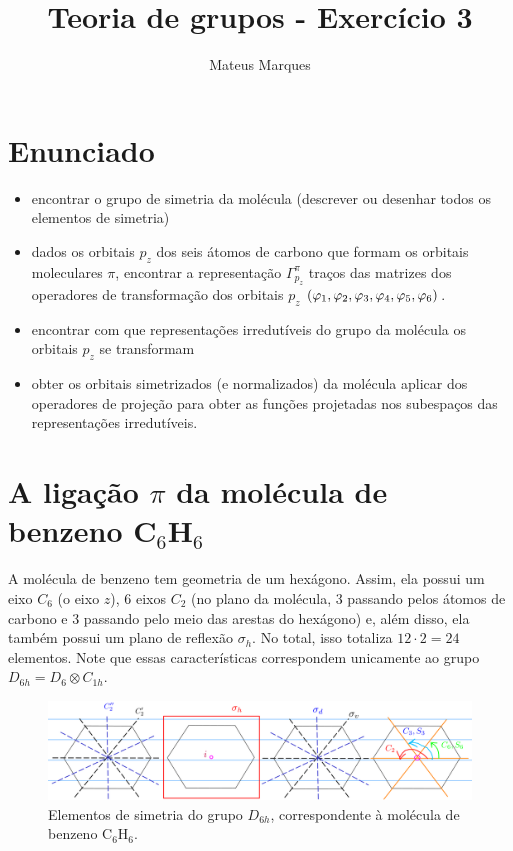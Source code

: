 \documentclass[a4paper,10pt]{article}
\title{\Huge{\textbf{Teoria de grupos - Exercício 3}}}
\author{Mateus Marques}
\begin{document}
\maketitle

\section*{Enunciado}

\begin{itemize}
\item encontrar o grupo de simetria da molécula (descrever ou desenhar todos os elementos de simetria)

\item dados os orbitais $p_z$ dos seis átomos de carbono que formam os orbitais moleculares $\pi$, encontrar a representação $\Gamma_{p_z}^\pi$ \implies
traços das matrizes dos operadores de transformação dos orbitais $p_z$ $(\varphi_1, \varphi_2, \varphi_3, \varphi_4, \varphi_5, \varphi_6)$.

\item encontrar com que representações irredutíveis do grupo da molécula os orbitais $p_z$ se transformam

\item obter os orbitais simetrizados (e normalizados) da molécula \implies aplicar dos operadores de projeção para obter as funções projetadas nos subespaços das representações irredutíveis.
\end{itemize}


\section*{A ligação $\pi$ da molécula de benzeno C$_6$H$_6$}

A molécula de benzeno tem geometria de um hexágono. Assim, ela possui um eixo $C_6$ (o eixo $z$), 6 eixos $C_2$ (no plano da molécula, 3 passando pelos átomos de carbono e 3 passando pelo meio das arestas do hexágono) e, além disso, ela também possui um plano de reflexão $\sigma_h$. No total, isso totaliza $12 \cdot 2 = 24$ elementos. Note que essas características correspondem unicamente ao grupo $D_{6h} = D_6 \otimes C_{1h}$.

\begin{figure}[H]
\centering
\includegraphics[width=1.0\linewidth]{fig/D6h.png}
\caption{Elementos de simetria do grupo $D_{6h}$, correspondente à molécula de benzeno C$_6$H$_6$.}
\label{fig:D6h}
\end{figure}
\end{document}
